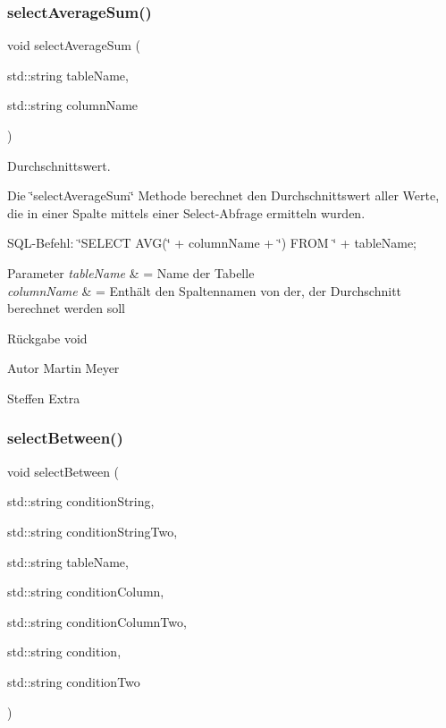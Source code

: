 \subsubsection{select\+Average\+Sum()}
{\footnotesize\ttfamily void select\+Average\+Sum (\begin{DoxyParamCaption}\item[{std\+::string}]{table\+Name,  }\item[{std\+::string}]{column\+Name }\end{DoxyParamCaption})}



Durchschnittswert. 

Die \char`\"{}select\+Average\+Sum\char`\"{} Methode berechnet den Durchschnittswert aller Werte, die in einer Spalte mittels einer Select-\/\+Abfrage ermitteln wurden.~\newline


S\+Q\+L-\/\+Befehl\+: \char`\"{}\+S\+E\+L\+E\+C\+T A\+V\+G(\char`\"{} + column\+Name + \char`\"{}) F\+R\+O\+M \char`\"{} + table\+Name;


\begin{DoxyParams}{Parameter}
{\em table\+Name} & = Name der Tabelle \\
\hline
{\em column\+Name} & = Enthält den Spaltennamen von der, der Durchschnitt berechnet werden soll\\
\hline
\end{DoxyParams}
\begin{DoxyReturn}{Rückgabe}
void
\end{DoxyReturn}
\begin{DoxyAuthor}{Autor}
Martin Meyer 

Steffen Extra 
\end{DoxyAuthor}
\mbox{\label{selection_request_8cpp_aaa15591ca7a3ba5d40fa77b7ae6753db}} 
\subsubsection{select\+Between()}
{\footnotesize\ttfamily void select\+Between (\begin{DoxyParamCaption}\item[{std\+::string}]{condition\+String,  }\item[{std\+::string}]{condition\+String\+Two,  }\item[{std\+::string}]{table\+Name,  }\item[{std\+::string}]{condition\+Column,  }\item[{std\+::string}]{condition\+Column\+Two,  }\item[{std\+::string}]{condition,  }\item[{std\+::string}]{condition\+Two }\end{DoxyParamCaption})}




